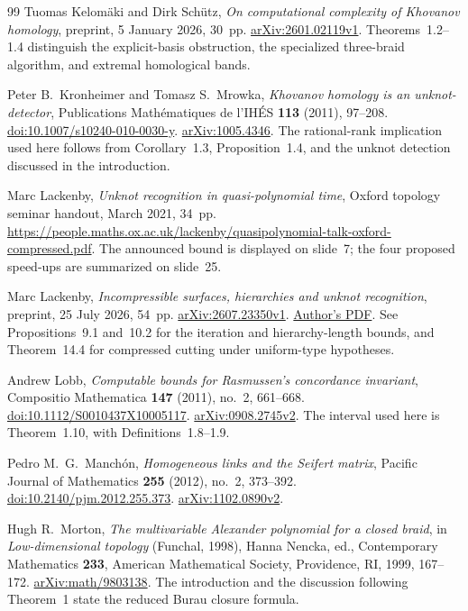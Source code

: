 \begin{thebibliography}{99}
Tuomas Kelom\"aki and Dirk Sch\"utz,
\emph{On computational complexity of Khovanov homology},
preprint, 5 January 2026, 30~pp.
\href{https://arxiv.org/abs/2601.02119v1}{arXiv:2601.02119v1}.
Theorems~1.2--1.4 distinguish the explicit-basis obstruction,
the specialized three-braid algorithm, and extremal homological bands.

Peter B.~Kronheimer and Tomasz S.~Mrowka,
\emph{Khovanov homology is an unknot-detector},
Publications Math\'ematiques de l'IH\'ES
\textbf{113} (2011), 97--208.
\href{https://doi.org/10.1007/s10240-010-0030-y}{doi:10.1007/s10240-010-0030-y}.
\href{https://arxiv.org/abs/1005.4346}{arXiv:1005.4346}.
The rational-rank implication used here follows from Corollary~1.3,
Proposition~1.4, and the unknot detection discussed in the introduction.

Marc Lackenby,
\emph{Unknot recognition in quasi-polynomial time},
Oxford topology seminar handout, March 2021, 34~pp.
\url{https://people.maths.ox.ac.uk/lackenby/quasipolynomial-talk-oxford-compressed.pdf}.
The announced bound is displayed on slide~7; the four proposed speed-ups
are summarized on slide~25.

Marc Lackenby,
\emph{Incompressible surfaces, hierarchies and unknot recognition},
preprint, 25 July 2026, 54~pp.
\href{https://arxiv.org/abs/2607.23350v1}{arXiv:2607.23350v1}.
\href{https://people.maths.ox.ac.uk/lackenby/algorithm-incompressible-250726.pdf}{Author's PDF}.
See Propositions~9.1 and~10.2 for the iteration and hierarchy-length bounds,
and Theorem~14.4 for compressed cutting under uniform-type hypotheses.

Andrew Lobb,
\emph{Computable bounds for Rasmussen's concordance invariant},
Compositio Mathematica
\textbf{147} (2011), no.~2, 661--668.
\href{https://doi.org/10.1112/S0010437X10005117}{doi:10.1112/S0010437X10005117}.
\href{https://arxiv.org/abs/0908.2745v2}{arXiv:0908.2745v2}.
The interval used here is Theorem~1.10, with Definitions~1.8--1.9.

Pedro M.~G.~Manch\'on,
\emph{Homogeneous links and the Seifert matrix},
Pacific Journal of Mathematics
\textbf{255} (2012), no.~2, 373--392.
\href{https://doi.org/10.2140/pjm.2012.255.373}{doi:10.2140/pjm.2012.255.373}.
\href{https://arxiv.org/abs/1102.0890v2}{arXiv:1102.0890v2}.

Hugh R.~Morton,
\emph{The multivariable Alexander polynomial for a closed braid},
in \emph{Low-dimensional topology} (Funchal, 1998),
Hanna Nencka, ed., Contemporary Mathematics \textbf{233},
American Mathematical Society, Providence, RI, 1999, 167--172.
\href{https://arxiv.org/abs/math/9803138}{arXiv:math/9803138}.
The introduction and the discussion following Theorem~1 state the
reduced Burau closure formula.


\end{thebibliography}
